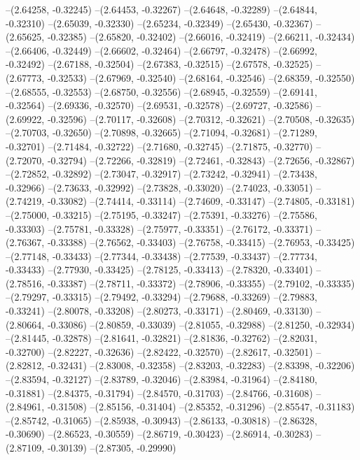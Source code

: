 --(2.64258, -0.32245)
--(2.64453, -0.32267)
--(2.64648, -0.32289)
--(2.64844, -0.32310)
--(2.65039, -0.32330)
--(2.65234, -0.32349)
--(2.65430, -0.32367)
--(2.65625, -0.32385)
--(2.65820, -0.32402)
--(2.66016, -0.32419)
--(2.66211, -0.32434)
--(2.66406, -0.32449)
--(2.66602, -0.32464)
--(2.66797, -0.32478)
--(2.66992, -0.32492)
--(2.67188, -0.32504)
--(2.67383, -0.32515)
--(2.67578, -0.32525)
--(2.67773, -0.32533)
--(2.67969, -0.32540)
--(2.68164, -0.32546)
--(2.68359, -0.32550)
--(2.68555, -0.32553)
--(2.68750, -0.32556)
--(2.68945, -0.32559)
--(2.69141, -0.32564)
--(2.69336, -0.32570)
--(2.69531, -0.32578)
--(2.69727, -0.32586)
--(2.69922, -0.32596)
--(2.70117, -0.32608)
--(2.70312, -0.32621)
--(2.70508, -0.32635)
--(2.70703, -0.32650)
--(2.70898, -0.32665)
--(2.71094, -0.32681)
--(2.71289, -0.32701)
--(2.71484, -0.32722)
--(2.71680, -0.32745)
--(2.71875, -0.32770)
--(2.72070, -0.32794)
--(2.72266, -0.32819)
--(2.72461, -0.32843)
--(2.72656, -0.32867)
--(2.72852, -0.32892)
--(2.73047, -0.32917)
--(2.73242, -0.32941)
--(2.73438, -0.32966)
--(2.73633, -0.32992)
--(2.73828, -0.33020)
--(2.74023, -0.33051)
--(2.74219, -0.33082)
--(2.74414, -0.33114)
--(2.74609, -0.33147)
--(2.74805, -0.33181)
--(2.75000, -0.33215)
--(2.75195, -0.33247)
--(2.75391, -0.33276)
--(2.75586, -0.33303)
--(2.75781, -0.33328)
--(2.75977, -0.33351)
--(2.76172, -0.33371)
--(2.76367, -0.33388)
--(2.76562, -0.33403)
--(2.76758, -0.33415)
--(2.76953, -0.33425)
--(2.77148, -0.33433)
--(2.77344, -0.33438)
--(2.77539, -0.33437)
--(2.77734, -0.33433)
--(2.77930, -0.33425)
--(2.78125, -0.33413)
--(2.78320, -0.33401)
--(2.78516, -0.33387)
--(2.78711, -0.33372)
--(2.78906, -0.33355)
--(2.79102, -0.33335)
--(2.79297, -0.33315)
--(2.79492, -0.33294)
--(2.79688, -0.33269)
--(2.79883, -0.33241)
--(2.80078, -0.33208)
--(2.80273, -0.33171)
--(2.80469, -0.33130)
--(2.80664, -0.33086)
--(2.80859, -0.33039)
--(2.81055, -0.32988)
--(2.81250, -0.32934)
--(2.81445, -0.32878)
--(2.81641, -0.32821)
--(2.81836, -0.32762)
--(2.82031, -0.32700)
--(2.82227, -0.32636)
--(2.82422, -0.32570)
--(2.82617, -0.32501)
--(2.82812, -0.32431)
--(2.83008, -0.32358)
--(2.83203, -0.32283)
--(2.83398, -0.32206)
--(2.83594, -0.32127)
--(2.83789, -0.32046)
--(2.83984, -0.31964)
--(2.84180, -0.31881)
--(2.84375, -0.31794)
--(2.84570, -0.31703)
--(2.84766, -0.31608)
--(2.84961, -0.31508)
--(2.85156, -0.31404)
--(2.85352, -0.31296)
--(2.85547, -0.31183)
--(2.85742, -0.31065)
--(2.85938, -0.30943)
--(2.86133, -0.30818)
--(2.86328, -0.30690)
--(2.86523, -0.30559)
--(2.86719, -0.30423)
--(2.86914, -0.30283)
--(2.87109, -0.30139)
--(2.87305, -0.29990)
